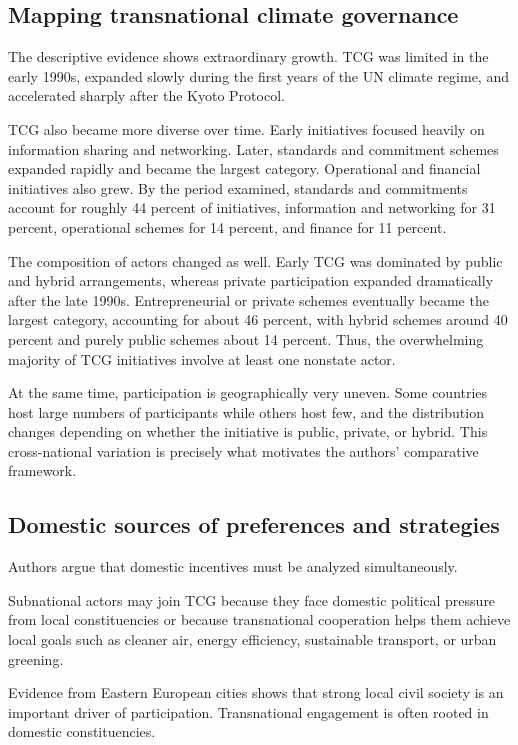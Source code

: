 \subsection{Mapping transnational climate governance}

The descriptive evidence shows extraordinary growth. TCG was limited in the early 1990s, expanded slowly during the first years of the UN climate regime, and accelerated sharply after the Kyoto Protocol.

TCG also became more diverse over time. Early initiatives focused heavily on information sharing and networking. Later, standards and commitment schemes expanded rapidly and became the largest category. Operational and financial initiatives also grew. By the period examined, standards and commitments account for roughly 44 percent of initiatives, information and networking for 31 percent, operational schemes for 14 percent, and finance for 11 percent.

The composition of actors changed as well. Early TCG was dominated by public and hybrid arrangements, whereas private participation expanded dramatically after the late 1990s. Entrepreneurial or private schemes eventually became the largest category, accounting for about 46 percent, with hybrid schemes around 40 percent and purely public schemes about 14 percent. Thus, the overwhelming majority of TCG initiatives involve at least one nonstate actor.

At the same time, participation is geographically very uneven. Some countries host large numbers of participants while others host few, and the distribution changes depending on whether the initiative is public, private, or hybrid. This cross-national variation is precisely what motivates the authors' comparative framework.

\subsection{Domestic sources of preferences and strategies}

Authors argue that domestic incentives must be analyzed simultaneously.

Subnational actors may join TCG because they face domestic political pressure from local constituencies or because transnational cooperation helps them achieve local goals such as cleaner air, energy efficiency, sustainable transport, or urban greening.

Evidence from Eastern European cities shows that strong local civil society is an important driver of participation. Transnational engagement is often rooted in domestic constituencies.

